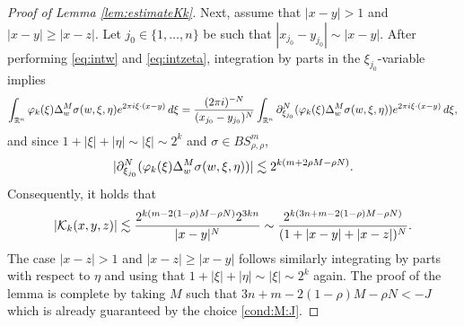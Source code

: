 \begin{proof}[Proof of Lemma \ref{lem:estimateKk}]
Next, assume that $|x-y| > 1$ and $|x-y| \geq |x-z|$. Let $j_0 \in \{1, \ldots, n\}$ be such that $|x_{j_0} - y_{j_0}| \sim |x-y|$. After performing \eqref{eq:intw} and \eqref{eq:intzeta}, integration by parts in the $\xi_{j_0}$-variable implies 
$$
\int_{{{\mathbb R}^n}} \varphi_k(\xi) \Delta_w^M\sigma(w, \xi, \eta) e^{2\pi i \xi \cdot( x- y)} \, d\xi = \frac{(2\pi i )^{-N}}{(x_{j_0} - y_{j_0})^{N}} \int_{{{\mathbb R}^n}} \partial_{\xi_{j_0}}^N (\varphi_k(\xi)  \Delta_w^M\sigma(w, \xi, \eta)) e^{2\pi i \xi \cdot( x- y)} \, d\xi,
$$
and since $1+|\xi| + |\eta| \sim |\xi| \sim 2^k$ and $\sigma  \in BS^m_{\rho, \rho}$,
$$
|\partial_{\xi_{j_0}}^N  (\varphi_k(\xi)  \Delta_w^M\sigma(w, \xi, \eta))| \lesssim 2^{k (m +2 \rho M -  \rho N)}.
$$
Consequently, it holds that
$$
|\mathcal{K}_k(x,y,z)| \lesssim \frac{2^{k(m- 2 (1-\rho)M - \rho N)} 2^{3kn}}{|x-y|^{N}} \sim \frac{2^{k(3n +m- 2 (1-\rho)M - \rho N)}}{(1+ |x-y| + |x-z|)^{N}}. 
$$
The case $|x-z| > 1$ and $|x-z| \geq |x-y|$ follows similarly integrating by parts with respect to $\eta$ and using that $1+|\xi| + |\eta| \sim |\xi| \sim 2^k$ again. The proof of the lemma is complete by taking $M$ such that $3n +m- 2 (1-\rho)M - \rho N < - J$ which is already guaranteed by the choice \eqref{cond:M:J}. 
 \end{proof}

